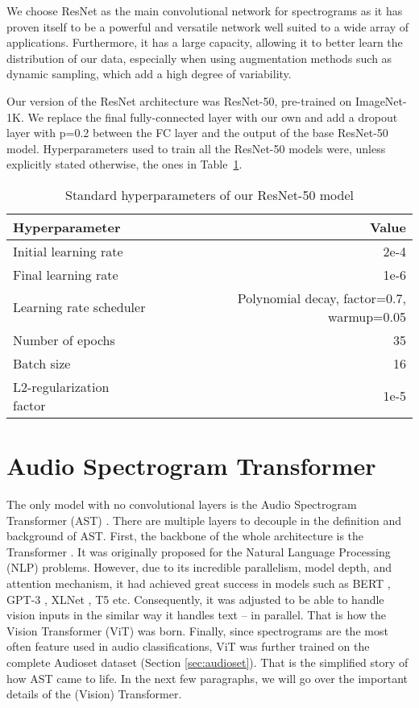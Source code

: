 We choose ResNet as the main convolutional network for spectrograms as it has proven itself to be a powerful and versatile network well suited to a wide array of applications. Furthermore, it has a large capacity, allowing it to better learn the distribution of our data, especially when using augmentation methods  such as dynamic sampling, which add a high degree of variability.

Our version of the ResNet architecture was ResNet-50, pre-trained on ImageNet-1K. We replace the final fully-connected layer with our own and add a dropout layer with p=0.2 between the FC layer and the output of the base ResNet-50 model. Hyperparameters used to train all the ResNet-50 models were, unless explicitly stated otherwise, the ones in Table~\ref{tab:resnet-hyperparams}.

\begin{table}[H]
\centering
\begin{tabular}{l r}
Hyperparameter           & Value   \\ \hline
Initial learning rate    & 2e-4                        \\
Final learning rate      & 1e-6                        \\
Learning rate scheduler  & Polynomial decay, factor=0.7, warmup=0.05 \\
Number of epochs         & 35                          \\
Batch size               & 16                          \\
L2-regularization factor & 1e-5                       
\end{tabular}
\caption{Standard hyperparameters of our ResNet-50 model}
\label{tab:resnet-hyperparams}
\end{table}



\section{Audio Spectrogram Transformer}
\label{sec:ast}
The only model with no convolutional layers is the Audio Spectrogram Transformer (AST) \cite{gong2021ast}. There are multiple layers to decouple in the definition and background of AST. First, the backbone of the whole architecture is the Transformer \cite{vaswani2017attention}. It was originally proposed for the Natural Language Processing (NLP) problems. However, due to its incredible parallelism, model depth, and attention mechanism, it had achieved great success in models such as BERT \cite{devlin2018bert}, GPT-3 \cite{brown2020language}, XLNet \cite{yang2019xlnet}, T5 \cite{raffel2020exploring} etc. Consequently, it was adjusted to be able to handle vision inputs in the similar way it handles text -- in parallel. That is how the Vision Transformer (ViT) \cite{kolesnikov2021image} was born. Finally, since spectrograms are the most often feature used in audio classifications, ViT was further trained on the complete Audioset dataset \cite{audioset2017}(Section \ref{sec:audioset}). That is the simplified story of how AST came to life. In the next few paragraphs, we will go over the important details of the (Vision) Transformer.

